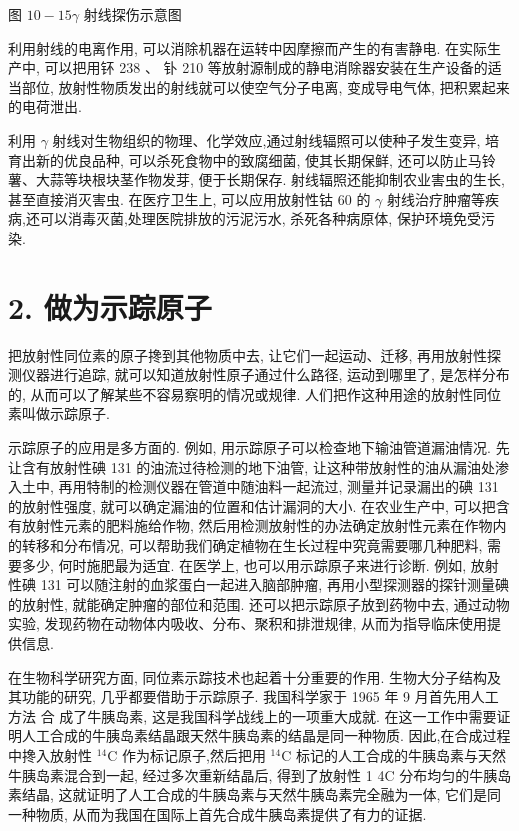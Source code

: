 \documentclass[10pt]{article}
\begin{document}
图 \({10} - {15\gamma }\) 射线探伤示意图

利用射线的电离作用, 可以消除机器在运转中因摩擦而产生的有害静电. 在实际生产中, 可以把用钚 238 、 钋 210 等放射源制成的静电消除器安装在生产设备的适当部位, 放射性物质发出的射线就可以使空气分子电离, 变成导电气体, 把积累起来的电荷泄出.

利用 \(\gamma\) 射线对生物组织的物理、化学效应,通过射线辐照可以使种子发生变异, 培育出新的优良品种, 可以杀死食物中的致腐细菌, 使其长期保鲜, 还可以防止马铃薯、大蒜等块根块茎作物发芽, 便于长期保存. 射线辐照还能抑制农业害虫的生长, 甚至直接消灭害虫. 在医疗卫生上, 可以应用放射性钴 60 的 \(\gamma\) 射线治疗肿瘤等疾病,还可以消毒灭菌,处理医院排放的污泥污水, 杀死各种病原体, 保护环境免受污染.

\section*{2. 做为示踪原子}

把放射性同位素的原子搀到其他物质中去, 让它们一起运动、迁移, 再用放射性探测仪器进行追踪, 就可以知道放射性原子通过什么路径, 运动到哪里了, 是怎样分布的, 从而可以了解某些不容易察明的情况或规律. 人们把作这种用途的放射性同位素叫做示踪原子.

示踪原子的应用是多方面的. 例如, 用示踪原子可以检查地下输油管道漏油情况. 先让含有放射性碘 131 的油流过待检测的地下油管, 让这种带放射性的油从漏油处渗入土中, 再用特制的检测仪器在管道中随油料一起流过, 测量并记录漏出的碘 131 的放射性强度, 就可以确定漏油的位置和估计漏洞的大小. 在农业生产中, 可以把含有放射性元素的肥料施给作物, 然后用检测放射性的办法确定放射性元素在作物内的转移和分布情况, 可以帮助我们确定植物在生长过程中究竟需要哪几种肥料, 需要多少, 何时施肥最为适宜. 在医学上, 也可以用示踪原子来进行诊断. 例如, 放射性碘 131 可以随注射的血浆蛋白一起进入脑部肿瘤, 再用小型探测器的探针测量碘的放射性, 就能确定肿瘤的部位和范围. 还可以把示踪原子放到药物中去, 通过动物实验, 发现药物在动物体内吸收、分布、聚积和排泄规律, 从而为指导临床使用提供信息.

在生物科学研究方面, 同位素示踪技术也起着十分重要的作用. 生物大分子结构及其功能的研究, 几乎都要借助于示踪原子. 我国科学家于 1965 年 9 月首先用人工方法 合 成了牛胰岛素, 这是我国科学战线上的一项重大成就. 在这一工作中需要证明人工合成的牛胰岛素结晶跟天然牛胰岛素的结晶是同一种物质. 因此,在合成过程中搀入放射性 \({}^{14}\mathrm{C}\) 作为标记原子,然后把用 \({}^{14}\mathrm{C}\) 标记的人工合成的牛胰岛素与天然牛胰岛素混合到一起, 经过多次重新结晶后, 得到了放射性 1 4C 分布均匀的牛胰岛素结晶, 这就证明了人工合成的牛胰岛素与天然牛胰岛素完全融为一体, 它们是同一种物质, 从而为我国在国际上首先合成牛胰岛素提供了有力的证据.
\end{document}
